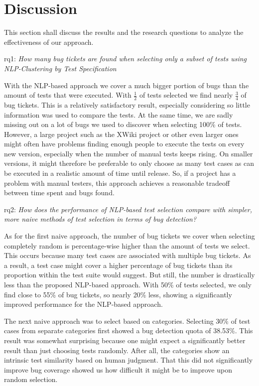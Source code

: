 \section{Discussion}

This section shall discuss the results and the research questions to analyze the effectiveness of our approach.

\ac{rq}1: \emph{How many bug tickets are found when selecting only a subset of tests using NLP-Clustering by Test Specification}


With the \ac*{NLP}-based approach we cover a much bigger portion of bugs than the amount of tests that were executed. With $\frac{1}{2}$ of tests selected we find nearly $\frac{3}{4}$ of bug tickets. This is a relatively satisfactory result, especially considering so little information was used to compare the tests. 
At the same time, we are sadly missing out on a lot of bugs we used to discover when selecting 100\% of tests.
However, a large project such as the XWiki project or other even larger ones might often have problems finding enough people to execute the tests on every new version, especially when the number of manual tests keeps rising. On smaller versions, it might therefore be preferable to only choose as many test cases as can be executed in a realistic amount of time until release.
So, if a project has a problem with manual testers, this approach achieves a reasonable tradeoff between time spent and bugs found.

\ac{rq}2: \emph{How does the performance of NLP-based test selection compare with simpler, more naive methods of test selection in terms of bug detection?}

As for the first naive approach, the number of bug tickets we cover when selecting completely random is percentage-wise higher than the amount of tests we select. This occurs because many test cases are associated with multiple bug tickets. As a result, a test case might cover a higher percentage of bug tickets than its proportion within the test suite would suggest. But still, the number is drastically less than the proposed \ac{NLP}-based approach. With 50\% of tests selected, we only find close to 55\% of bug tickets, so nearly 20\% less, showing a significantly improved performance for the \ac{NLP}-based approach.

The next naive approach was to select based on categories. Selecting 30\% of test cases from separate categories first showed a bug detection quota of 38.53\%. This result was somewhat surprising because one might expect a significantly better result than just choosing tests randomly. After all, the categories show an intrinsic test similarity based on human judgment. That this did not significantly improve bug coverage showed us how difficult it might be to improve upon random selection.

